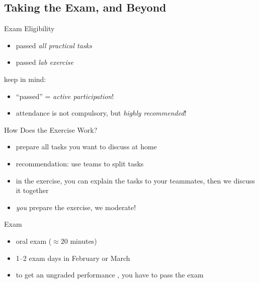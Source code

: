 \subsection{Taking the Exam, and Beyond}

\begin{frame}[b]{\myframetitle}
	\begin{mycolumns}[b]
		\begin{definition}{Exam Eligibility }
			\begin{itemize}
				\item passed \emph{all practical tasks}
				\item passed \emph{lab exercise}
			\end{itemize}
			keep in mind:
			\begin{itemize}
				\item ``passed'' = \emph{active participation}!
				\item attendance is not compulsory, but \emph{highly recommended}!
			\end{itemize}
		\end{definition}
		\begin{example}{How Does the Exercise Work?}
			\begin{itemize}
				\item prepare all tasks you want to discuss at home
				\item recommendation: use teams to split tasks
				\item in the exercise, you can explain the tasks to your teammates, then we discuss it together
				\item \emph{you} prepare the exercise, we moderate!
			\end{itemize}
		\end{example}
	\mynextcolumn
		\begin{definition}{Exam}
			\begin{itemize}
				\item oral exam ($\approx 20$ minutes)
				\item 1--2 exam days in February or March
				\item to get an ungraded performance , you have to pass the exam

\end{itemize}
\end{definition}
\end{mycolumns}
\end{frame}

